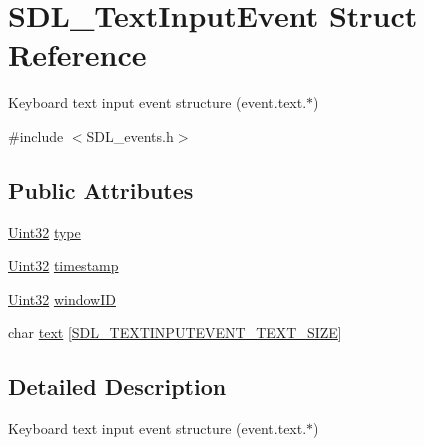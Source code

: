 \hypertarget{struct_s_d_l___text_input_event}{\section{S\-D\-L\-\_\-\-Text\-Input\-Event Struct Reference}
\label{struct_s_d_l___text_input_event}
}


Keyboard text input event structure (event.\-text.$\ast$)  




{\ttfamily \#include $<$S\-D\-L\-\_\-events.\-h$>$}

\subsection*{Public Attributes}
\begin{DoxyCompactItemize}
\item 
\hyperlink{_s_d_l__stdinc_8h_add440eff171ea5f55cb00c4a9ab8672d}{Uint32} \hyperlink{struct_s_d_l___text_input_event_a90576be2ea52e694deff40d0586654f5}{type}
\item 
\hyperlink{_s_d_l__stdinc_8h_add440eff171ea5f55cb00c4a9ab8672d}{Uint32} \hyperlink{struct_s_d_l___text_input_event_a20b190a96494918690ea7f99187be948}{timestamp}
\item 
\hyperlink{_s_d_l__stdinc_8h_add440eff171ea5f55cb00c4a9ab8672d}{Uint32} \hyperlink{struct_s_d_l___text_input_event_aeb4f7a939353990ca40261ffbfbeb3d0}{window\-I\-D}
\item 
char \hyperlink{struct_s_d_l___text_input_event_a1a95531f466dff01c2f108f53ff24554}{text} \mbox{[}\hyperlink{_s_d_l__events_8h_a43822437fd5e89c1da1841a813cad4aa}{S\-D\-L\-\_\-\-T\-E\-X\-T\-I\-N\-P\-U\-T\-E\-V\-E\-N\-T\-\_\-\-T\-E\-X\-T\-\_\-\-S\-I\-Z\-E}\mbox{]}
\end{DoxyCompactItemize}


\subsection{Detailed Description}
Keyboard text input event structure (event.\-text.$\ast$) 

